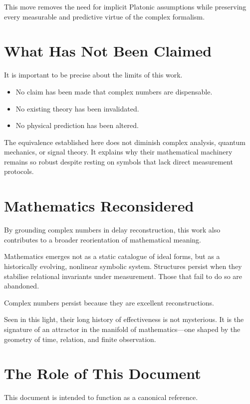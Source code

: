 \documentclass[12pt]{book}  %
\begin{document}
This move removes the need for implicit Platonic assumptions while preserving every measurable and predictive virtue of the complex formalism.

\section*{What Has Not Been Claimed}

It is important to be precise about the limits of this work.

\begin{itemize}
    \item No claim has been made that complex numbers are dispensable.
    \item No existing theory has been invalidated.
    \item No physical prediction has been altered.
\end{itemize}

The equivalence established here does not diminish complex analysis, quantum mechanics, or signal theory. It explains why their mathematical machinery remains so robust despite resting on symbols that lack direct measurement protocols.

\section*{Mathematics Reconsidered}

By grounding complex numbers in delay reconstruction, this work also contributes to a broader reorientation of mathematical meaning.

Mathematics emerges not as a static catalogue of ideal forms, but as a historically evolving, nonlinear symbolic system. Structures persist when they stabilise relational invariants under measurement. Those that fail to do so are abandoned.

Complex numbers persist because they are excellent reconstructions.

Seen in this light, their long history of effectiveness is not mysterious. It is the signature of an attractor in the manifold of mathematics—one shaped by the geometry of time, relation, and finite observation.

\section*{The Role of This Document}

This document is intended to function as a canonical reference.
\end{document}
